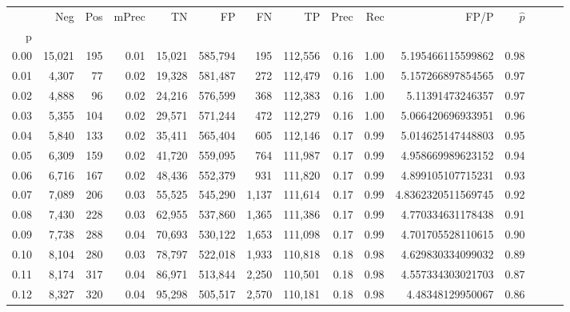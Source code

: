 \begin{tabular}{rrrrrrrrrrrrrrr}
\toprule
{} &     Neg &    Pos & mPrec &       TN &       FP &       FN &       TP &  Prec &   Rec &                  FP/P & $\hat{p}$ \\
p    &         &        &       &          &          &          &          &       &       &                       &           \\
\midrule
0.00 &  15,021 &    195 &  0.01 &   15,021 &  585,794 &      195 &  112,556 &  0.16 &  1.00 &     5.195466115599862 &      0.98 \\
0.01 &   4,307 &     77 &  0.02 &   19,328 &  581,487 &      272 &  112,479 &  0.16 &  1.00 &     5.157266897854565 &      0.97 \\
0.02 &   4,888 &     96 &  0.02 &   24,216 &  576,599 &      368 &  112,383 &  0.16 &  1.00 &      5.11391473246357 &      0.97 \\
0.03 &   5,355 &    104 &  0.02 &   29,571 &  571,244 &      472 &  112,279 &  0.16 &  1.00 &     5.066420696933951 &      0.96 \\
0.04 &   5,840 &    133 &  0.02 &   35,411 &  565,404 &      605 &  112,146 &  0.17 &  0.99 &     5.014625147448803 &      0.95 \\
0.05 &   6,309 &    159 &  0.02 &   41,720 &  559,095 &      764 &  111,987 &  0.17 &  0.99 &     4.958669989623152 &      0.94 \\
0.06 &   6,716 &    167 &  0.02 &   48,436 &  552,379 &      931 &  111,820 &  0.17 &  0.99 &     4.899105107715231 &      0.93 \\
0.07 &   7,089 &    206 &  0.03 &   55,525 &  545,290 &    1,137 &  111,614 &  0.17 &  0.99 &    4.8362320511569745 &      0.92 \\
0.08 &   7,430 &    228 &  0.03 &   62,955 &  537,860 &    1,365 &  111,386 &  0.17 &  0.99 &     4.770334631178438 &      0.91 \\
0.09 &   7,738 &    288 &  0.04 &   70,693 &  530,122 &    1,653 &  111,098 &  0.17 &  0.99 &     4.701705528110615 &      0.90 \\
0.10 &   8,104 &    280 &  0.03 &   78,797 &  522,018 &    1,933 &  110,818 &  0.18 &  0.98 &     4.629830334099032 &      0.89 \\
0.11 &   8,174 &    317 &  0.04 &   86,971 &  513,844 &    2,250 &  110,501 &  0.18 &  0.98 &     4.557334303021703 &      0.87 \\
0.12 &   8,327 &    320 &  0.04 &   95,298 &  505,517 &    2,570 &  110,181 &  0.18 &  0.98 &      4.48348129950067 &      0.86 \\

\end{tabular}
